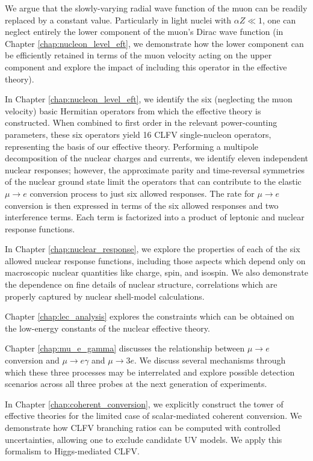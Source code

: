 \documentclass{book}[letterpaper,12pt]
\begin{document}
We argue that the slowly-varying radial wave function of the muon can be readily replaced by a constant value. Particularly in light nuclei with $\alpha Z\ll 1$, one can neglect entirely the lower component of the muon's Dirac wave function (in Chapter \ref{chap:nucleon_level_eft}, we demonstrate how the lower component can be efficiently retained in terms of the muon velocity acting on the upper component and explore the impact of including this operator in the effective theory). 

In Chapter \ref{chap:nucleon_level_eft}, we identify the six (neglecting the muon velocity) basic Hermitian operators from which the effective theory is constructed. When combined to first order in the relevant power-counting parameters, these six operators yield 16 CLFV single-nucleon operators, representing the basis of our effective theory. Performing a multipole decomposition of the nuclear charges and currents, we identify eleven independent nuclear responses; however, the approximate parity and time-reversal symmetries of the nuclear ground state limit the operators that can contribute to the elastic $\mu\rightarrow e$ conversion process to just six allowed responses. The rate for $\mu\rightarrow e$ conversion is then expressed in terms of the six allowed responses and two interference terms. Each term is factorized into a product of leptonic and nuclear response functions.

In Chapter \ref{chap:nuclear_response}, we explore the properties of each of the six allowed nuclear response functions, including those aspects which depend only on macroscopic nuclear quantities like charge, spin, and isospin. We also demonstrate the dependence on fine details of nuclear structure, correlations which are properly captured by nuclear shell-model calculations. 

Chapter \ref{chap:lec_analysis} explores the constraints which can be obtained on the low-energy constants of the nuclear effective theory.

Chapter \ref{chap:mu_e_gamma} discusses the relationship between $\mu\rightarrow e$ conversion and $\mu\rightarrow e\gamma$ and $\mu\rightarrow 3e$. We discuss several mechanisms through which these three processes may be interrelated and explore possible detection scenarios across all three probes at the next generation of experiments.

In Chapter \ref{chap:coherent_conversion}, we explicitly construct the tower of effective theories for the limited case of scalar-mediated coherent conversion. We demonstrate how CLFV branching ratios can be computed with controlled uncertainties, allowing one to exclude candidate UV models. We apply this formalism to Higgs-mediated CLFV.
\end{document}
